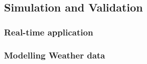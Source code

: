 \subsection{Simulation and Validation}
\subsubsection{Real-time application}
\subsubsection{Modelling Weather data}